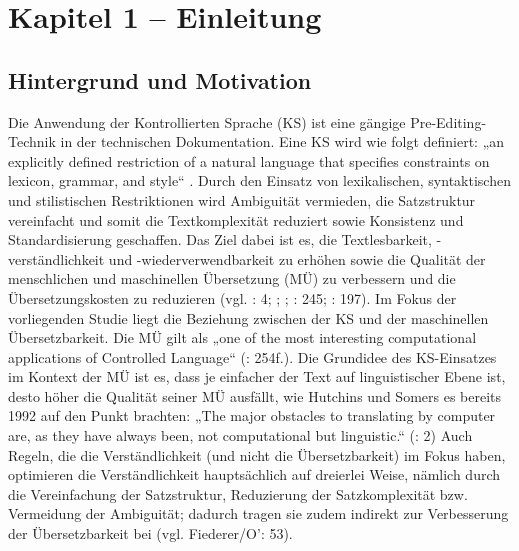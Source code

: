 \chapter{\label{Toc51705127}{}Kapitel 1 – Einleitung}




\section{\label{Toc51705128}{}{{Hintergrund und Motivation}}}

Die Anwendung der Kontrollierten Sprache (KS) ist eine gängige Pre-Editing-Technik in der technischen Dokumentation. Eine KS wird wie folgt definiert: „an explicitly defined restriction of a natural language that specifies constraints on lexicon, grammar, and style“ \citep[2]{Huijsen1998}. Durch den Einsatz von lexikalischen, syntaktischen und stilistischen Restriktionen wird Ambiguität vermieden, die Satzstruktur vereinfacht und somit die Textkomplexität reduziert sowie Konsistenz und Standardisierung geschaffen. Das Ziel dabei ist es, die Textlesbarkeit, -verständlichkeit und \nobreakdash-wiederverwendbarkeit zu erhöhen sowie die Qualität der menschlichen und maschinellen Übersetzung (MÜ) zu verbessern und die Übersetzungskosten zu reduzieren (vgl. \citealt{HutchinsSomers1992}: 4; \citealt{Lehrndorfer1996a}; \citealt{Hujisen1998}; \citealt{NybergEtAl2003}: 245; \citealt{DrewerZiegler2014}: 197). Im Fokus der vorliegenden Studie liegt die Beziehung zwischen der KS und der maschinellen Übersetzbarkeit. Die MÜ gilt als „one of the most interesting computational applications of Controlled Language“ (\citealt{NybergEtAl2003}: 254f.). Die Grundidee des KS-Einsatzes im Kontext der MÜ ist es, dass je einfacher der Text auf linguistischer Ebene ist, desto höher die Qualität seiner MÜ ausfällt, wie Hutchins und Somers es bereits 1992 auf den Punkt brachten: „The major obstacles to translating by computer are, as they have always been, not computational but linguistic.“ (\citealt{HutchinsSomers1992}: 2) Auch Regeln, die die Verständlichkeit (und nicht die Übersetzbarkeit) im Fokus haben, optimieren die Verständlichkeit hauptsächlich auf dreierlei Weise, nämlich durch die Vereinfachung der Satzstruktur, Reduzierung der Satzkomplexität bzw. Vermeidung der Ambiguität;  dadurch tragen sie zudem indirekt zur Verbesserung der Übersetzbarkeit bei (vgl. Fiederer/O'\citealt{Brien2009}: 53).

